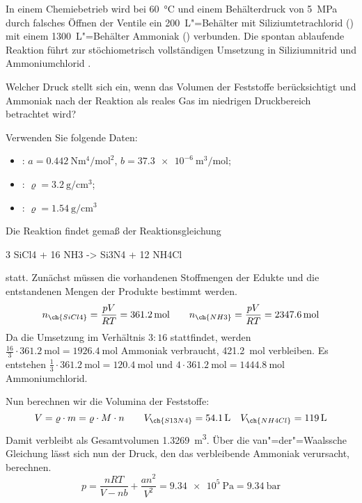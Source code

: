 \documentclass[DIV11]{scrartcl}
\begin{document}
\begin{question}[name=Chemiebetrieb]
In einem Chemiebetrieb wird bei \SI{60}{\celsius} und einem Behälterdruck von
\SI{5}{\mega\pascal} durch falsches Öffnen der Ventile ein
\SI{200}{\liter}"=Behälter mit Siliziumtetrachlorid () mit einem
\SI{1300}{\liter}"=Behälter Ammoniak () verbunden.  Die spontan
ablaufende Reaktion führt zur stöchiometrisch vollständigen Umsetzung in
Siliziumnitrid  und Ammoniumchlorid .

Welcher Druck stellt sich ein, wenn das Volumen der Feststoffe berücksichtigt
und Ammoniak nach der Reaktion als reales Gas im niedrigen Druckbereich
betrachtet wird?

Verwenden Sie folgende Daten:
\begin{itemize}
  \item {}:
    $a = \SI{0.442}{\newton\metre\tothe4\per\mole\squared}$,
    $b = \SI{37.3e-6}{\metre\cubed\per\mole}$;
  \item {}:
    $\varrho = \SI{3.2}{\gram\per\centi\metre\cubed}$;
  \item {}:
    $\varrho = \SI{1.54}{\gram\per\centi\metre\cubed}$
\end{itemize}
\end{question}
\begin{solution}[name=Chemiebetrieb]
  Die Reaktion findet gemaß der Reaktionsgleichung
  \begin{reaction*}
    3 SiCl4 + 16 NH3 -> Si3N4 + 12 NH4Cl
  \end{reaction*}
  statt.  Zunächst müssen die vorhandenen Stoffmengen der Edukte und die
  entstandenen Mengen der Produkte bestimmt werden.
  \[
    n_{\ch{SiCl4}} = \frac{pV}{RT} = \SI{361.2}{\mole}
    \qquad
    n_{\ch{NH3}}   = \frac{pV}{RT} = \SI{2347.6}{\mole}
  \]
  Da die Umsetzung im Verhältnis $3:16$ stattfindet, werden
  $\frac{16}{3}\cdot\SI{361.2}{\mole} = \SI{1926.4}{\mole}$ Ammoniak
  verbraucht, \SI{421.2}{\mole} verbleiben.  Es entstehen
  $\frac{1}{3}\cdot\SI{361.2}{\mole} = \SI{120.4}{\mole}$  und
  $4\cdot\SI{361.2}{\mole} = \SI{1444.8}{\mole}$ Ammoniumchlorid.

  Nun berechnen wir die Volumina der Feststoffe:
  \[
    V = \varrho \cdot m = \varrho\cdot M\cdot n
    \qquad
    V_{\ch{S13N4}} = \SI{54.1}{\liter}
    \quad
    V_{\ch{NH4Cl}} = \SI{119}{\liter}
  \]
  Damit verbleibt als Gesamtvolumen \SI{1.3269}{\metre\cubed}.  Über die
  van"=der"=Waalssche Gleichung lässt sich nun der Druck, den das verbleibende
  Ammoniak verursacht, berechnen.
  \[
    p = \frac{nRT}{V-nb} + \frac{an^2}{V^2}
      = \SI{9.34e5}{\pascal}
      = \SI{9.34}{\bar}
  \]
\end{solution}

\newpage
{}
\printsolutions
\end{document}
